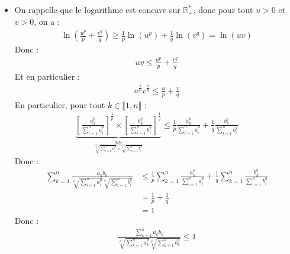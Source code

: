 \documentclass[../main.tex]{subfiles}
\begin{document}
\begin{itemize}
    \item On rappelle que le logarithme est concave sur $\mathbb{R}_+^*$, donc pour tout $u > 0$ et $v > 0$, on a :
    \begin{align*}
        \ln \left( \frac{u^p}{p} + \frac{v^q}{q} \right) \geq \frac{1}{p} \ln(u^p) + \frac{1}{q} \ln(v^q) = \ln(uv)
    \end{align*}
    Donc : 
    \begin{align*}
        uv \leq \frac{u^p}{p} + \frac{v^q}{q}
    \end{align*}
    Et en particulier : 
    \begin{align*}
        u^{\frac{1}{p}}v^{\frac{1}{q}} \leq \frac{u}{p} + \frac{v}{q}
    \end{align*}
    En particulier, pour tout $k \in \llbracket 1, n \rrbracket$ : 
    \begin{align*}
        \underbrace{\left[ \frac{a_k^p}{\sum\limits_{i=1}^{n} a_i^p} \right]^{\frac{1}{p}} \times \left[ \frac{b_k^q}{\sum\limits_{i=1}^{n} b_i^q} \right]^{\frac{1}{q}}}_{\frac{a_k b_k}{\sqrt[p]{\sum\limits_{i=1}^{n} a_i^p} \times \sqrt[q]{\sum\limits_{i=1}^{n} b_i^q}}} \leq \frac{1}{p} \frac{a_k^p}{\sum\limits_{i=1}^{n} a_i^p} + \frac{1}{q} \frac{b_k^q}{\sum\limits_{i=1}^{n} b_i^q}
    \end{align*}
    Donc : 
    \begin{align*}
        \sum_{k=1}^{n} \frac{a_k b_k}{\sqrt[p]{\sum\limits_{i=1}^{n} a_i^p} \sqrt[q]{\sum\limits_{i=1}^{n} b_i^q}} &\leq \frac{1}{p} \sum_{k=1}^{n} \frac{a_k^p}{\sum\limits_{i=1}^{n} a_i^p} + \frac{1}{q} \sum_{k=1}^{n} \frac{b_k^q}{\sum\limits_{i=1}^{n} b_i^q} \\
        &= \frac{1}{p} + \frac{1}{q} \\
        &= 1
    \end{align*}
    Donc : 
    \begin{align*}
        \frac{\sum\limits_{k=1}^{n} a_kb_k}{\sqrt[p]{\sum\limits_{k=1}^{n} a_k^p} \sqrt[q]{\sum\limits_{k=1}^{n} b_k^q}} \leq 1
    \end{align*}


\end{itemize}
\end{document}
